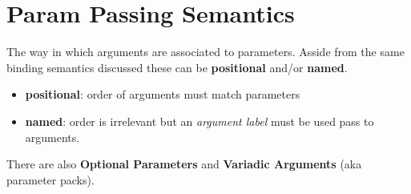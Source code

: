 \section{Param Passing Semantics}
The way in which arguments are associated to parameters. Asside from the
same binding semantics discussed these can be \textbf{positional} and/or
\textbf{named}.
\begin{itemize}
  \item \textbf{positional}: order of arguments must match parameters
  \item \textbf{named}: order is irrelevant but an \textit{argument
  label} must be used pass to arguments.
\end{itemize}

There are also \textbf{Optional Parameters} and \textbf{Variadic
Arguments} (aka parameter packs).